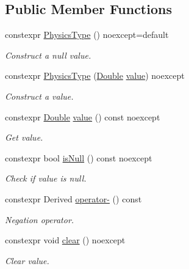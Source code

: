 \subsection*{Public Member Functions}
\begin{DoxyCompactItemize}
\item 
constexpr \hyperlink{class_mdt_1_1_numeric_1_1_physics_type_a696d9d6d263562f2b07651c79901b67e}{Physics\+Type} () noexcept=default
\begin{DoxyCompactList}\small\item\em Construct a null value. \end{DoxyCompactList}\item 
constexpr \hyperlink{class_mdt_1_1_numeric_1_1_physics_type_a5a5aeff282457f7e34a4ac256640b8e9}{Physics\+Type} (\hyperlink{class_mdt_1_1_numeric_1_1_double}{Double} \hyperlink{class_mdt_1_1_numeric_1_1_physics_type_a9bc72c7175657ebbe35c0d3758fd7454}{value}) noexcept
\begin{DoxyCompactList}\small\item\em Construct a value. \end{DoxyCompactList}\item 
constexpr \hyperlink{class_mdt_1_1_numeric_1_1_double}{Double} \hyperlink{class_mdt_1_1_numeric_1_1_physics_type_a9bc72c7175657ebbe35c0d3758fd7454}{value} () const noexcept
\begin{DoxyCompactList}\small\item\em Get value. \end{DoxyCompactList}\item 
constexpr bool \hyperlink{class_mdt_1_1_numeric_1_1_physics_type_a1b845d6c259ae2e71613e7a1115cf779}{is\+Null} () const noexcept
\begin{DoxyCompactList}\small\item\em Check if value is null. \end{DoxyCompactList}\item 
constexpr Derived \hyperlink{class_mdt_1_1_numeric_1_1_physics_type_a64db52654db34e613d3cb7f673a6610f}{operator-\/} () const 
\begin{DoxyCompactList}\small\item\em Negation operator. \end{DoxyCompactList}\item 
constexpr void \hyperlink{class_mdt_1_1_numeric_1_1_physics_type_a7f2eda637785fd676a25a62972ae601c}{clear} () noexcept
\begin{DoxyCompactList}\small\item\em Clear value. \end{DoxyCompactList}\end{DoxyCompactItemize}
